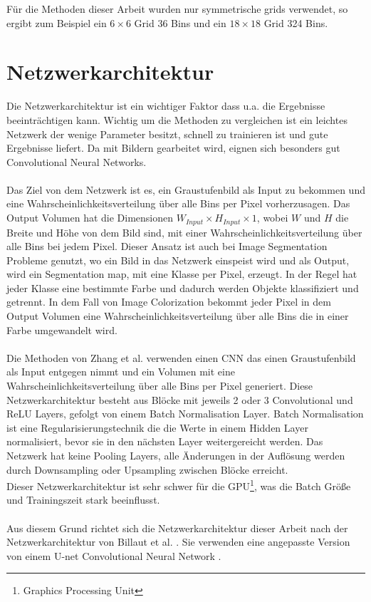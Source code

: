 Für die Methoden dieser Arbeit wurden nur symmetrische \gls{grid}s verwendet, so ergibt zum Beispiel ein $6 \times 6$ Grid 36 Bins und 
ein $18 \times 18$ Grid 324 Bins.

\section{Netzwerkarchitektur}
Die Netzwerkarchitektur ist ein wichtiger Faktor dass u.a. die Ergebnisse beeinträchtigen kann. Wichtig um die Methoden zu vergleichen ist ein
leichtes Netzwerk der wenige Parameter besitzt, schnell zu trainieren ist und gute Ergebnisse liefert. Da mit Bildern gearbeitet wird, eignen sich
besonders gut Convolutional Neural Networks.
\\
\\
Das Ziel von dem Netzwerk ist es, ein Graustufenbild als Input zu bekommen und eine Wahrscheinlichkeitsverteilung über alle Bins per Pixel vorherzusagen.
Das Output Volumen hat die Dimensionen $ W_{Input} \times H_{Input} \times 1 $, wobei $W$ und $H$ die Breite und Höhe von dem Bild sind,
mit einer Wahrscheinlichkeitsverteilung über alle Bins bei jedem Pixel. Dieser Ansatz ist auch bei Image Segmentation Probleme genutzt, wo ein Bild
in das Netzwerk einspeist wird und als Output, wird ein Segmentation map, mit eine Klasse per Pixel, erzeugt. In der Regel hat jeder Klasse eine
bestimmte Farbe und dadurch werden Objekte klassifiziert und getrennt. In dem Fall von Image Colorization bekommt jeder Pixel in dem Output Volumen
eine Wahrscheinlichkeitsverteilung über alle Bins die in einer Farbe umgewandelt wird.
\\
\\
Die Methoden von Zhang et al. \cite{zhang2016colorful} verwenden einen \gls{CNN} das einen Graustufenbild als Input entgegen nimmt und ein Volumen mit
eine Wahrscheinlichkeitsverteilung über alle Bins per Pixel generiert. Diese Netzwerkarchitektur besteht aus Blöcke mit jeweils 2 oder 3 Convolutional
und ReLU Layers, gefolgt von einem Batch Normalisation Layer. Batch Normalisation ist eine Regularisierungstechnik die die Werte in einem Hidden Layer
normalisiert, bevor sie in den nächsten Layer weitergereicht werden. Das Netzwerk hat keine Pooling Layers, alle Änderungen in der Auflösung werden durch
Downsampling oder Upsampling zwischen Blöcke erreicht.
\\
Dieser Netzwerkarchitektur ist sehr schwer für die GPU\footnote{Graphics Processing Unit}, was die Batch Größe und Trainingszeit stark beeinflusst.
\\
\\
Aus diesem Grund richtet sich die Netzwerkarchitektur dieser Arbeit nach der Netzwerkarchitektur von Billaut et al. \cite{billaut2018colorunet}. 
Sie verwenden eine angepasste Version von einem U-net Convolutional Neural Network \cite{ronneberger2015unet}. 

